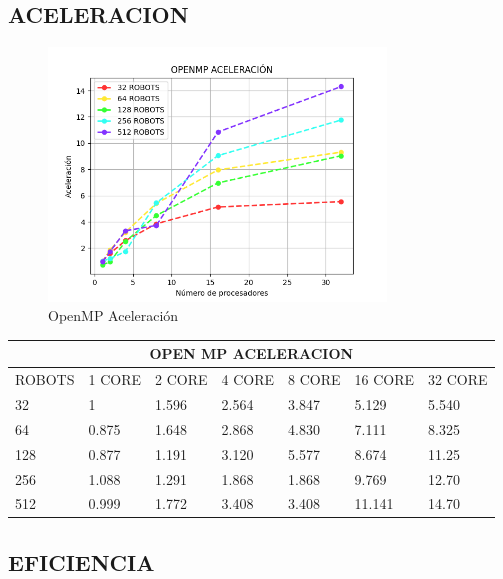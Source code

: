 \documentclass[oneside,twocolumn]{article}
\begin{document}
\newpage
\subsection{ACELERACION}

\begin{figure}[h]
    \centering
    \includegraphics[width=0.80\textwidth]{graficos/openmp/openmp_acc.png}
    \caption{OpenMP Aceleración}
    \label{fig:secuencial}
\end{figure}

\begin{center}
\begin{tabular}{ |p{2cm}||p{2cm}||p{2cm}||p{2cm}||p{2cm}||p{2cm}||p{2cm}| }
 \hline
 \multicolumn{7}{|c|}{OPEN MP ACELERACION} \\
 \hline
 ROBOTS & 1 CORE & 2 CORE & 4 CORE & 8 CORE & 16 CORE & 32 CORE\\
 \hline
 32   & 1     & 1.596 & 2.564 & 3.847 & 5.129  & 5.540\\ \hline
 64   & 0.875 & 1.648 & 2.868 & 4.830 & 7.111  & 8.325\\ \hline
 128  & 0.877 & 1.191 & 3.120 & 5.577 & 8.674  & 11.25\\ \hline
 256  & 1.088 & 1.291 & 1.868 & 1.868 & 9.769  & 12.70\\ \hline
 512  & 0.999 & 1.772 & 3.408 & 3.408 & 11.141 & 14.70\\ \hline
 \hline
\end{tabular}
\end{center}

\newpage
\subsection{EFICIENCIA}
\end{document}
